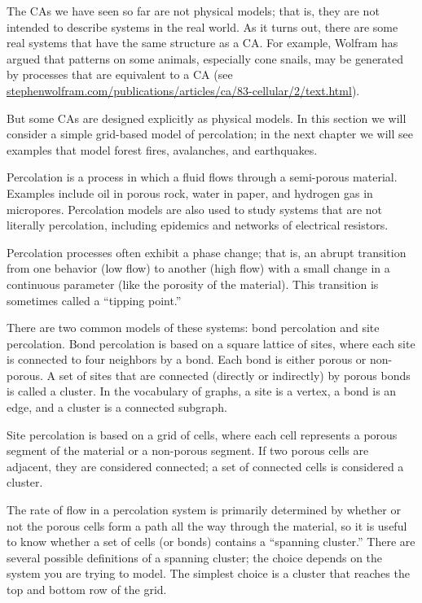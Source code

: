 \documentclass[10pt]{book}
\begin{document}
The CAs we have seen so far are not physical models; that is, they are
not intended to describe systems in the real world.  As it turns out,
there are some real systems that have the same structure as a CA.  For
example, Wolfram has argued that patterns on some animals, especially
cone snails, may be generated by processes that are equivalent to a CA
(see
\url{stephenwolfram.com/publications/articles/ca/83-cellular/2/text.html}).

But some CAs are designed explicitly as physical models.  In this
section we will consider a simple grid-based model of percolation;
in the next chapter we will see examples that model forest fires,
avalanches, and earthquakes.

Percolation is a process in which a fluid flows through a semi-porous
material.  Examples include oil in porous rock, water in paper, and
hydrogen gas in micropores.  Percolation models are also used to study
systems that are not literally percolation, including epidemics and
networks of electrical resistors.

Percolation processes often exhibit a phase change; that is, an
abrupt transition from one behavior (low flow) to another
(high flow) with a small change in a continuous parameter (like
the porosity of the material).  This transition is sometimes
called a ``tipping point.''

There are two common models of these systems: bond percolation
and site percolation.  Bond percolation is based on a square lattice
of sites, where each site is connected to four neighbors by
a bond.  Each bond is either porous or non-porous.  A set of sites
that are connected (directly or indirectly) by porous bonds is
called a cluster.  In the vocabulary of graphs, a site is a vertex,
a bond is an edge, and a cluster is a connected subgraph.

Site percolation is based on a grid of cells, where each cell
represents a porous
segment of the material or a non-porous segment.  If two porous
cells are adjacent, they are considered connected; a set of
connected cells is considered a cluster.

The rate of flow in a percolation system is primarily determined by
whether or not the porous cells form a path all the way through the
material, so it is useful to know whether a set of cells (or bonds)
contains a ``spanning cluster.''  There are several possible
definitions of a spanning cluster; the choice depends on the system
you are trying to model. The simplest choice is a cluster that reaches
the top and bottom row of the grid.
\end{document}
